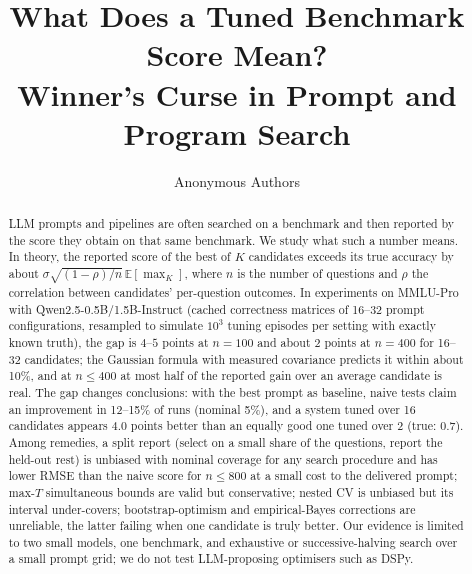 \documentclass{article}
\title{What Does a Tuned Benchmark Score Mean?\\Winner's Curse in Prompt and Program Search}
\author{Anonymous Authors}
\begin{document}
\maketitle

\begin{abstract}
LLM prompts and pipelines are often searched on a benchmark and then reported by the score they obtain on that same benchmark. We study what such a number means. In theory, the reported score of the best of $K$ candidates exceeds its true accuracy by about $\sigma\sqrt{(1-\rho)/n}\,\mathbb E[\max_K]$, where $n$ is the number of questions and $\rho$ the correlation between candidates' per-question outcomes. In experiments on MMLU-Pro with Qwen2.5-0.5B/1.5B-Instruct (cached correctness matrices of 16--32 prompt configurations, resampled to simulate $10^3$ tuning episodes per setting with exactly known truth), the gap is $4$--$5$ points at $n{=}100$ and about $2$ points at $n{=}400$ for 16--32 candidates; the Gaussian formula with measured covariance predicts it within about 10\%, and at $n\le400$ at most half of the reported gain over an average candidate is real. The gap changes conclusions: with the best prompt as baseline, naive tests claim an improvement in 12--15\% of runs (nominal 5\%), and a system tuned over 16 candidates appears $4.0$ points better than an equally good one tuned over 2 (true: $0.7$). Among remedies, a split report (select on a small share of the questions, report the held-out rest) is unbiased with nominal coverage for any search procedure and has lower RMSE than the naive score for $n\le800$ at a small cost to the delivered prompt; max-$T$ simultaneous bounds are valid but conservative; nested CV is unbiased but its interval under-covers; bootstrap-optimism and empirical-Bayes corrections are unreliable, the latter failing when one candidate is truly better. Our evidence is limited to two small models, one benchmark, and exhaustive or successive-halving search over a small prompt grid; we do not test LLM-proposing optimisers such as DSPy.
\end{abstract}







\label{endmain}





\newpage

\end{document}
